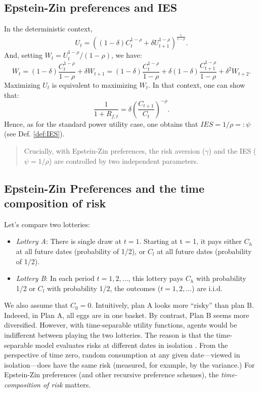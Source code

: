 \documentclass[
  12pt,
]{book}
\providecommand{\tightlist}{%
  \setlength{\itemsep}{0pt}\setlength{\parskip}{0pt}}
\theoremstyle{definition}
\theoremstyle{definition}
\theoremstyle{definition}
\theoremstyle{definition}
\theoremstyle{remark}
\begin{document}
\hypertarget{epstein-zin-preferences-and-ies}{%
\subsection{Epstein-Zin preferences and IES}\label{epstein-zin-preferences-and-ies}}

In the deterministic context,
\[
U_t = \left((1-\delta)C_t^{1-\rho} + \delta U_{t+1}^{1-\rho}\right)^{\frac{1}{1-\rho}}.
\]
And, setting \(W_t = U_t^{1-\rho}/(1-\rho)\), we have:
\[
W_t = (1-\delta)\frac{C_t^{1-\rho}}{1-\rho} + \delta W_{t+1} = (1-\delta)\frac{C_t^{1-\rho}}{1-\rho} + \delta(1-\delta)\frac{C_{t+1}^{1-\rho}}{1-\rho} + \delta^2 W_{t+2}.
\]
Maximizing \(U_t\) is equivalent to maximizing \(W_t\). In that context, one can show that:
\[
\frac{1}{1+ R_{f,t}}=\delta \left(\frac{C_{t+1}}{C_t}\right)^{-\rho}.
\]
Hence, as for the standard power utility case, one obtains that \(IES = 1/\rho =: \psi\) (see Def. \ref{def:IES}).

\begin{quote}
Crucially, with Epstein-Zin preferences, the risk aversion (\(\gamma\)) and the IES (\(\psi=1/\rho\)) are controlled by two independent parameters.
\end{quote}

\hypertarget{epstein-zin-preferences-and-the-time-composition-of-risk}{%
\subsection{Epstein-Zin Preferences and the time composition of risk}\label{epstein-zin-preferences-and-the-time-composition-of-risk}}

Let's compare two lotteries:

\begin{itemize}
\tightlist
\item
  \emph{Lottery A}: There is single draw at \(t=1\). Starting at t = 1, it pays either \(C_h\) at all future dates (probability of 1/2), or \(C_l\) at all future dates (probability of 1/2).
\item
  \emph{Lottery B}: In each period \(t = 1, 2, \dots\), this lottery pays \(C_h\) with probability 1/2 or \(C_l\) with probability 1/2, the outcomes (\(t = 1, 2, \dots\)) are i.i.d.
\end{itemize}

We also assume that \(C_0=0\). Intuitively, plan A looks more ``risky'' than plan B. Indeeed, in Plan A, all eggs are in one basket. By contrast, Plan B seems more diversified.
However, with time-separable utility functions, agents would be indifferent between playing the two lotteries. The reason is that the time-separable model evaluates risks at different dates in isolation \citep{Piazzesi_Schneider_2007}. From the perspective of time zero, random consumption at any given date---viewed in isolation---does have the same risk (measured, for example, by the variance.) For Epstein-Zin preferences (and other recursive preference schemes), the \emph{time-composition of risk} matters.
\end{document}
